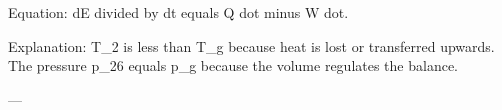 Equation:  
dE divided by dt equals Q dot minus W dot.  

Explanation:  
T_2 is less than T_g because heat is lost or transferred upwards.  
The pressure p_26 equals p_g because the volume regulates the balance.  

---